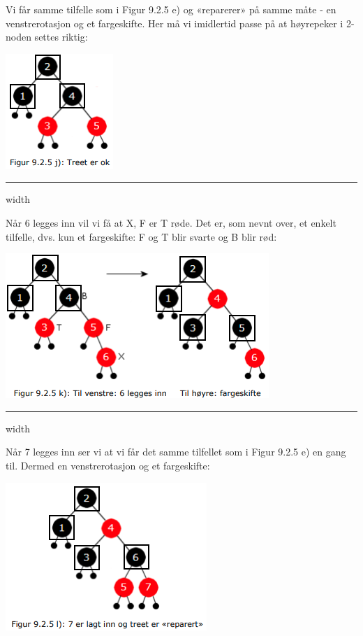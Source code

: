 \documentclass[11pt]{article}
\begin{document}
        \begin{multicols}{2}
            Vi får samme tilfelle som i Figur 9.2.5 e) og «reparerer» på samme måte - en venstrerotasjon
            og et fargeskifte. Her må vi imidlertid passe på at høyrepeker i 2-noden settes riktig:

            \columnbreak
            \includegraphics[center]{f-9.2.5j.png}


        \end{multicols}

        \hrule width \textwidth

        Når 6 legges inn vil vi få at X, F er T røde. Det er, som nevnt over, et enkelt tilfelle, dvs. kun
        et fargeskifte: F og T blir svarte og B blir rød:

        \includegraphics[center]{f-9.2.5k.png}


        \hrule width \textwidth

        \begin{multicols}{2}
            Når 7 legges inn ser vi at vi får det samme tilfellet som i Figur 9.2.5 e) en gang til. Dermed
            en venstrerotasjon og et fargeskifte:

            \columnbreak
            \includegraphics[center]{f-9.2.5l.png}


        \end{multicols}
\end{document}
